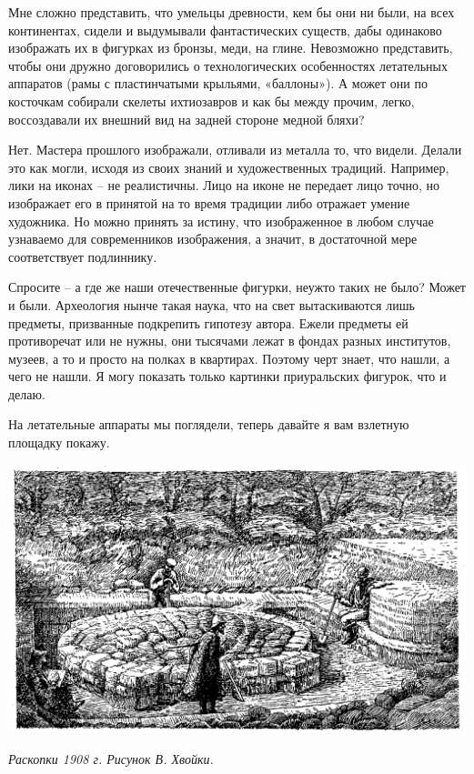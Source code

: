 Мне сложно представить, что умельцы древности, кем бы они ни были, на всех континентах, сидели и выдумывали фантастических существ, дабы одинаково изображать их в фигурках из бронзы, меди, на глине. Невозможно представить, чтобы они дружно договорились о технологических особенностях летательных аппаратов (рамы с пластинчатыми крыльями, «баллоны»). А может они по косточкам собирали скелеты ихтиозавров и как бы между прочим, легко, воссоздавали их внешний вид на задней стороне медной бляхи?

Нет. Мастера прошлого изображали, отливали из металла то, что видели. Делали это как могли, исходя из своих знаний и художественных традиций. Например, лики на иконах – не реалистичны. Лицо на иконе не передает лицо точно, но изображает его в принятой на то время традиции либо отражает умение художника. Но можно принять за истину, что изображенное в любом случае узнаваемо для современников изображения, а значит, в достаточной мере соответствует подлиннику.

Спросите – а где же наши отечественные фигурки, неужто таких не было? Может и были. Археология нынче такая наука, что на свет вытаскиваются лишь предметы, призванные подкрепить гипотезу автора. Ежели предметы ей противоречат или не нужны, они тысячами лежат в фондах разных институтов, музеев, а то и просто на полках в квартирах. Поэтому черт знает, что нашли, а чего не нашли. Я могу показать только картинки приуральских фигурок, что и делаю.

На летательные аппараты мы поглядели, теперь давайте я вам взлетную площадку покажу.

\begin{center}
\includegraphics[width=\linewidth]{chast-zmiy/ktotakiezmei/hvoyka-kapishe-01.png}

\textit{Раскопки 1908 г. Рисунок В. Хвойки.}
\end{center}

